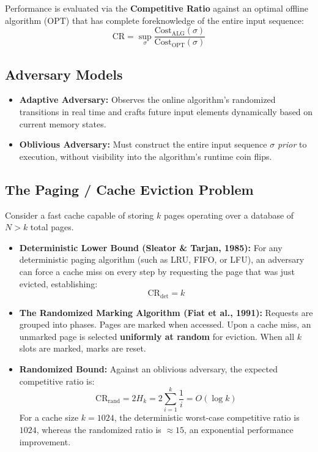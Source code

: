 \documentclass[11pt,a4paper]{article}
\begin{document}
Performance is evaluated via the \textbf{Competitive Ratio} against an optimal offline algorithm ($\text{OPT}$) that has complete foreknowledge of the entire input sequence:
\begin{equation}
\text{CR} = \sup_\sigma \frac{\text{Cost}_{\text{ALG}}(\sigma)}{\text{Cost}_{\text{OPT}}(\sigma)}
\end{equation}

\subsection{Adversary Models}
\begin{itemize}
    \item \textbf{Adaptive Adversary:} Observes the online algorithm's randomized transitions in real time and crafts future input elements dynamically based on current memory states.
    \item \textbf{Oblivious Adversary:} Must construct the entire input sequence $\sigma$ \textit{prior} to execution, without visibility into the algorithm's runtime coin flips.
\end{itemize}

\subsection{The Paging / Cache Eviction Problem}
Consider a fast cache capable of storing $k$ pages operating over a database of $N > k$ total pages.
\begin{itemize}
    \item \textbf{Deterministic Lower Bound (Sleator \& Tarjan, 1985):} For any deterministic paging algorithm (such as LRU, FIFO, or LFU), an adversary can force a cache miss on every step by requesting the page that was just evicted, establishing:
    \begin{equation}
    \text{CR}_{\text{det}} = k
    \end{equation}
    \item \textbf{The Randomized Marking Algorithm (Fiat et al., 1991):} Requests are grouped into phases. Pages are marked when accessed. Upon a cache miss, an unmarked page is selected \textbf{uniformly at random} for eviction. When all $k$ slots are marked, marks are reset.
    \item \textbf{Randomized Bound:} Against an oblivious adversary, the expected competitive ratio is:
    \begin{equation}
    \text{CR}_{\text{rand}} = 2 H_k = 2 \sum_{i=1}^k \frac{1}{i} = O(\log k)
    \end{equation}
    For a cache size $k = 1024$, the deterministic worst-case competitive ratio is $1024$, whereas the randomized ratio is $\approx 15$, an exponential performance improvement.
\end{itemize}
\end{document}
